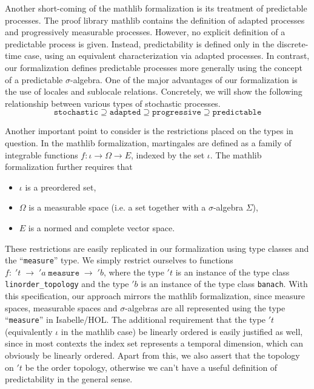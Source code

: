 Another short-coming of the \textsf{mathlib} formalization is its treatment of predictable processes. The proof library \textsf{mathlib} contains the definition of adapted processes and progressively measurable processes. However, no explicit definition of a predictable process is given. Instead, predictability is defined only in the discrete-time case, using an equivalent characterization via adapted processes. In contrast, our formalization defines predictable processes more generally using the concept of a predictable $\sigma$-algebra. One of the major advantages of our formalization is the use of locales and sublocale relations. Concretely, we will show the following relationship between various types of stochastic processes.
\[
	\texttt{stochastic} \supseteq \texttt{adapted} \supseteq \texttt{progressive} \supseteq \texttt{predictable}
\]

Another important point to consider is the restrictions placed on the types in question. In the \textsf{mathlib} formalization, martingales are defined as a family of integrable functions $f : \iota \rightarrow \Omega \rightarrow E$, indexed by the set $\iota$. The \textsf{mathlib} formalization further requires that
\begin{itemize}
\item $\iota$ is a preordered set,
\item $\Omega$ is a measurable space (i.e. a set together with a $\sigma$-algebra $\Sigma$),
\item $E$ is a normed and complete vector space.
\end{itemize}

These restrictions are easily replicated in our formalization using type classes and the ``\texttt{measure}'' type. We simply restrict ourselves to functions $f : \; 't \;\rightarrow \; 'a \;\texttt{measure} \;\rightarrow\; 'b$, where the type $'t$ is an instance of the type class \texttt{linorder\_topology} and the type $'b$ is an instance of the type class \texttt{banach}. With this specification, our approach mirrors the \textsf{mathlib} formalization, since measure spaces, measurable spaces and $\sigma$-algebras are all represented using the type ``\texttt{measure}'' in Isabelle/HOL. The additional requirement that the type $'t$ (equivalently $\iota$ in the \textsf{mathlib} case) be linearly ordered is easily justified as well, since in most contexts the index set represents a temporal dimension, which can obviously be linearly ordered. Apart from this, we also assert that the topology on $'t$ be the order topology, otherwise we can't have a useful definition of predictability in the general sense.

